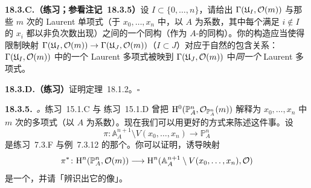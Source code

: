 \textbf{18.3.C.（练习；参看\mbox{注记~18.3.5}）}\quad 设 $I\subset\{0,\dots,n\}$，请给出 $\Gamma(\mathfrak{U}_I,\mathcal{O}(m))$ 与那些 $m$ 次\trHomogeneous{}的 Laurent 单项式（于 $x_0,\dots,x_n$ 中，以 $A$ 为系数，其中每个满足 $i\notin I$ 的 $x_i$ 都以非负次数出现）之间的一个同构（作为 $A$-\trModule{}的同构）。你的构造应当使得限制映射 $\Gamma(\mathfrak{U}_I,\mathcal{O}(m))\to\Gamma(\mathfrak{U}_J,\mathcal{O}(m))$（$I\subset J$）对应于自然的包含关系：$\Gamma(\mathfrak{U}_I,\mathcal{O}(m))$ 中的一个 Laurent 多项式被映到 $\Gamma(\mathfrak{U}_J,\mathcal{O}(m))$ 中\emph{同一个} Laurent 多项式。

\textbf{18.3.D.（练习）}\quad 证明\mbox{定理~18.1.2}。\hfill$\square$

\textbf{18.3.5.}\ \emph{\trhRemark{}。}\quad \mbox{练习~15.1.C} 与 \mbox{练习~15.1.D} 曾把 $\mathrm{H}^0(\mathbb{P}^n_A,\mathcal{O}_{\mathbb{P}^n_A}(m))$ 解释为 $x_0,\dots,x_n$ 中 $m$ 次\trHomogeneous{}的多项式（以 $A$ 为系数）。现在我们可以用更好的方式来陈述这件事。设
\[
\pi\colon\mathbb{A}^{n+1}_A\setminus V(x_0,\dots,x_n)\longrightarrow\mathbb{P}^n_A
\]
是\mbox{练习~7.3.F} 与\mbox{例~7.3.12} 的那个\trMorphism。你可以证明，诱导映射
\[
\pi^*\colon\mathrm{H}^n(\mathbb{P}^n_A,\mathcal{O}(m))\longrightarrow\mathrm{H}^n(\mathbb{A}^{n+1}_A\setminus V(x_0,\dots,x_n),\mathcal{O})
\]
是一个\trInclusionMap，并请「辨识出它的像」。
